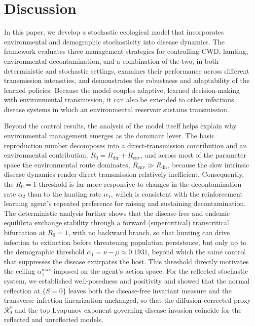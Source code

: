 \documentclass[12pt,a4paper,reqno]{amsart}
\theoremstyle{definition}
\theoremstyle{remark}
\theoremstyle{plain}
\begin{document}
\section{Discussion}\label{Sec:Disc}
In this paper, we develop a stochastic ecological model that incorporates environmental and demographic stochasticity into disease dynamics. The framework evaluates three management strategies for controlling CWD, hunting, environmental decontamination, and a combination of the two, in both deterministic and stochastic settings, examines their performance across different transmission intensities, and demonstrates the robustness and adaptability of the learned policies. Because the model couples adaptive, learned decision-making with environmental transmission, it can also be extended to other infectious disease systems in which an environmental reservoir sustains transmission.

Beyond the control results, the analysis of the model itself helps explain why environmental management emerges as the dominant lever. The basic reproduction number decomposes into a direct-transmission contribution and an environmental contribution, $R_0 = R_{\mathrm{dir}} + R_{\mathrm{env}}$, and across most of the parameter space the environmental route dominates, $R_{\mathrm{env}} \gg R_{\mathrm{dir}}$, because the slow intrinsic disease dynamics render direct transmission relatively inefficient. Consequently, the $R_0=1$ threshold is far more responsive to changes in the decontamination rate $\alpha_2$ than to the hunting rate $\alpha_1$, which is consistent with the reinforcement learning agent's repeated preference for raising and sustaining decontamination. The deterministic analysis further shows that the disease-free and endemic equilibria exchange stability through a forward (supercritical) transcritical bifurcation at $R_0=1$, with no backward branch, so that hunting can drive infection to extinction before threatening population persistence, but only up to the demographic threshold $\alpha_1=\nu-\mu\approx 0.1931$, beyond which the same control that suppresses the disease extirpates the host. This threshold directly motivates the ceiling $\alpha_1^{\max}$ imposed on the agent's action space. For the reflected stochastic system, we established well-posedness and positivity and showed that the normal reflection at $\{S=0\}$ leaves both the disease-free invariant measure and the transverse infection linearization unchanged, so that the diffusion-corrected proxy $\mathcal{R}_0^s$ and the top Lyapunov exponent governing disease invasion coincide for the reflected and unreflected models.
\end{document}
